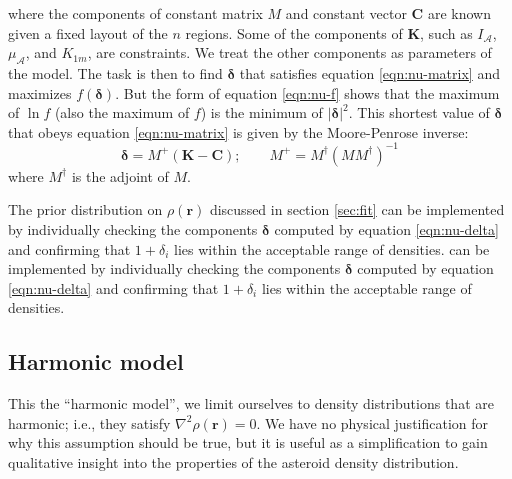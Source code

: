 where the components of constant matrix $M$ and constant vector $\bm C$ are known given a fixed layout of the $n$ regions. Some of the components of $\bm K$, such as $I_\mathcal{A}$, $\mu_\mathcal{A}$, and $K_{1m}$, are constraints. We treat the other components as parameters of the model. The task is then to find $\bm \delta$ that satisfies equation \ref{eqn:nu-matrix} and maximizes $f(\bm \delta)$. But the form of equation \ref{eqn:nu-f} shows that the maximum of $\ln f$ (also the maximum of $f$) is the minimum of $|\bm \delta|^2$. This shortest value of $\bm \delta$ that obeys equation \ref{eqn:nu-matrix} is given by the Moore-Penrose inverse:
\begin{equation}
  \bm \delta = M^+ (\bm K - \bm C); \qquad M^+ = M^\dagger(M M^\dagger)^{-1}
  \label{eqn:nu-delta}
\end{equation}
where $M^\dagger$ is the adjoint of $M$.

The prior distribution on $\rho(\bm r)$ discussed in section \ref{sec:fit} can be implemented by individually checking the components $\bm \delta$ computed by equation \ref{eqn:nu-delta} and confirming that $1 + \delta_i$ lies within the acceptable range of densities.
 can be implemented by individually checking the components $\bm \delta$ computed by equation \ref{eqn:nu-delta} and confirming that $1 + \delta_i$ lies within the acceptable range of densities.


\subsection{Harmonic model}
This the ``harmonic model'', we limit ourselves to density distributions that are harmonic; i.e., they satisfy $\nabla^2 \rho(\bm r) = 0$. We have no physical justification for why this assumption should be true, but it is useful as a simplification to gain qualitative insight into the properties of the asteroid density distribution.

